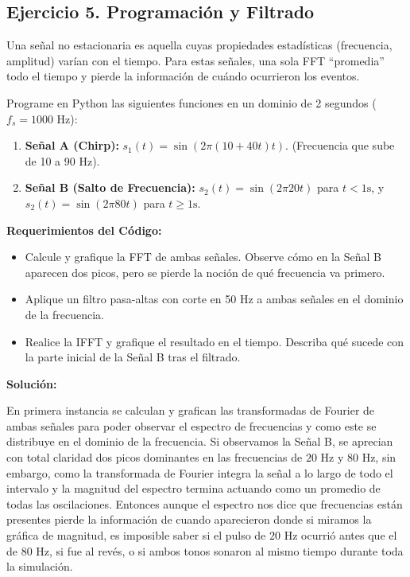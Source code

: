 \subsection*{Ejercicio 5. Programación y Filtrado}

Una señal no estacionaria es aquella cuyas propiedades estadísticas (frecuencia, amplitud) varían con el tiempo. Para estas señales, una sola FFT ``promedia'' todo el tiempo y pierde la información de cuándo ocurrieron los eventos.

Programe en Python las siguientes funciones en un dominio de 2 segundos ($f_s = 1000$ Hz):
\begin{enumerate}
    \item \textbf{Señal A (Chirp):} $s_1(t) = \sin(2\pi(10 + 40t)t)$. (Frecuencia que sube de 10 a 90 Hz).
    \item \textbf{Señal B (Salto de Frecuencia):} $s_2(t) = \sin(2\pi 20t)$ para $t < 1\text{s}$, y $s_2(t) = \sin(2\pi 80t)$ para $t \geq 1\text{s}$.
\end{enumerate}

\textbf{Requerimientos del Código:}
\begin{itemize}
    \item Calcule y grafique la FFT de ambas señales. Observe cómo en la Señal B aparecen dos picos, pero se pierde la noción de qué frecuencia va primero.
    \item Aplique un filtro pasa-altas con corte en 50 Hz a ambas señales en el dominio de la frecuencia.
    \item Realice la IFFT y grafique el resultado en el tiempo. Describa qué sucede con la parte inicial de la Señal B tras el filtrado.
\end{itemize}

\vspace{0.5cm}

\textbf{Solución:}


En primera instancia se calculan y grafican las transformadas de Fourier de ambas señales para poder observar el espectro de frecuencias y como este se distribuye en el dominio de la frecuencia. Si observamos la Señal B, se aprecian con total claridad dos picos dominantes en las frecuencias de $20\text{ Hz}$ y $80\text{ Hz}$, sin embargo, como la transformada de Fourier integra la señal a lo largo de todo el intervalo y la magnitud del espectro termina actuando como un promedio de todas las oscilaciones. Entonces aunque el espectro nos dice que frecuencias están presentes pierde la información de cuando aparecieron donde si miramos la gráfica de magnitud, es imposible saber si el pulso de $20\text{ Hz}$ ocurrió antes que el de $80\text{ Hz}$, si fue al revés, o si ambos tonos sonaron al mismo tiempo durante toda la simulación.

